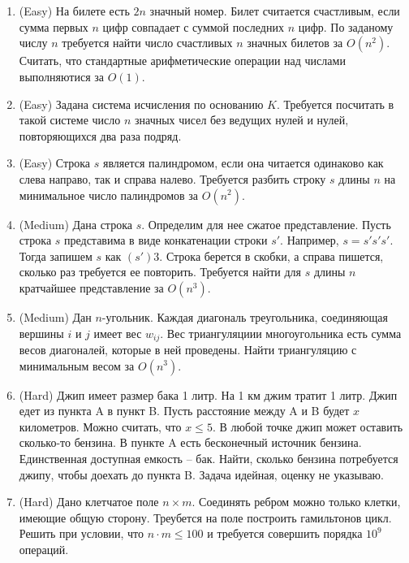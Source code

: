 \section{}

\begin{enumerate}

  \item (Easy) На билете есть $2n$ значный номер. Билет считается
  счастливым, если сумма первых $n$ цифр совпадает с суммой последних
  $n$ цифр. По заданому числу $n$ требуется найти число счастливых $n$
  значных билетов за $O(n^2)$. Считать, что стандартные арифметические
  операции над числами выполняютися за $O(1)$.

  \item (Easy) Задана система исчисления по основанию $K$. Требуется
  посчитать в такой системе число $n$ значных чисел без ведущих нулей 
  и нулей, повторяющихся два раза подряд.

  \item (Easy) Строка $s$ является палиндромом, если она читается
  одинаково как слева направо, так и справа налево. Требуется разбить
  строку $s$ длины $n$ на минимальное число палиндромов за $O(n^2)$.  
  
  \item (Medium) Дана строка $s$. Определим для нее сжатое представление.
  Пусть строка $s$ представима в виде конкатенации строки $s'$. 
  Например, $s = s's's'$. Тогда запишем $s$ как $(s')3$. Строка
  берется в скобки, а справа пишется, сколько раз требуется ее 
  повторить. Требуется найти для $s$ длины $n$ кратчайшее представление
  за $O(n^3)$.

  \item (Medium) Дан $n$-угольник. Каждая диагональ треугольника, соединяющая
  вершины $i$ и $j$ имеет вес $w_{ij}$. Вес триангуляциии многоугольника есть
  сумма весов диагоналей, которые в ней проведены. Найти триангуляцию с минимальным
  весом за $O(n^3)$.

  \item (Hard) Джип имеет размер бака 1 литр. На 1 км джим тратит 1 литр. Джип
  едет из пункта A в пункт B. Пусть расстояние между A и B будет $x$ километров. 
  Можно считать, что $x \leq 5$. В любой точке джип может оставить сколько-то бензина.
  В пункте A есть бесконечный источник бензина. Единственная доступная емкость -- бак.
  Найти, сколько бензина потребуется джипу, чтобы доехать до пункта B.
  Задача идейная, оценку не указываю.

  \item (Hard) Дано клетчатое поле $n \times m$. Соединять ребром можно только клетки,
  имеющие общую сторону. Треубется на поле построить гамильтонов цикл. Решить при
  условии, что $n \cdot m \leq 100$ и требуется совершить порядка $10^9$ операций.

\end{enumerate}
